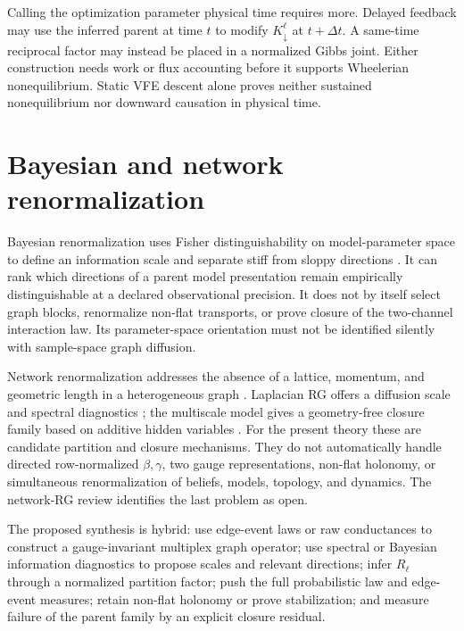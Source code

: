 Calling the optimization parameter physical time requires more. Delayed
feedback may use the inferred parent at time $t$ to modify
$K_\downarrow^\ell$ at $t+\Delta t$. A same-time reciprocal factor may instead
be placed in a normalized Gibbs joint. Either construction needs work or flux
accounting before it supports Wheelerian nonequilibrium. Static VFE descent
alone proves neither sustained nonequilibrium nor downward causation in
physical time. 

\section{Bayesian and network renormalization}
\label{sec:full-graph-vfe-literature}

Bayesian renormalization uses Fisher distinguishability on model-parameter
space to define an information scale and separate stiff from sloppy
directions \citep{BermanKlingerStapleton2023}. It can rank which directions
of a parent model presentation remain empirically distinguishable at a
declared observational precision. It does not by itself select graph blocks,
renormalize non-flat transports, or prove closure of the two-channel
interaction law. Its parameter-space orientation must not be identified
silently with sample-space graph diffusion.

Network renormalization addresses the absence of a lattice, momentum, and
geometric length in a heterogeneous graph \citep{gabrielli2025network}.
Laplacian RG offers a diffusion scale and spectral diagnostics
\citep{villegas2023laplacian}; the multiscale model gives a geometry-free
closure family based on additive hidden variables
\citep{Garuccio2023Multiscale}. For the present theory these are candidate
partition and closure mechanisms. They do not automatically handle directed
row-normalized $\beta,\gamma$, two gauge representations, non-flat holonomy,
or simultaneous renormalization of beliefs, models, topology, and dynamics.
The network-RG review identifies the last problem as open.

The proposed synthesis is hybrid: use edge-event laws or raw conductances to
construct a gauge-invariant multiplex graph operator; use spectral or
Bayesian information diagnostics to propose scales and relevant directions;
infer $R_\ell$ through a normalized partition factor; push the full
probabilistic law and edge-event measures; retain non-flat holonomy or prove
stabilization; and measure failure of the parent family by an explicit closure
residual. 

